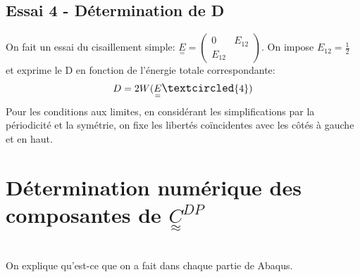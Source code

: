 \documentclass{article}
\begin{document}
\subsection{Essai \large{\textcircled{\small{4}}} - Détermination de D}
On fait un essai du cisaillement simple: $\underset{=}{E}=\begin{pmatrix}0 & E_{12}\\E_{12}\end{pmatrix}$. On impose $E_{12}=\frac{1}{2}$ et exprime le D en fonction de l'énergie totale correspondante:\\
\begin{align*}
    D=2W(\underset{=}{E}\large{\textcircled{\small{4}}})
\end{align*}
Pour les conditions aux limites, en considérant les simplifications par la périodicité et la symétrie, on fixe les libertés coïncidentes avec les côtés à gauche et en haut. 



\section{Détermination numérique des composantes de $\underset{\approx}{C}^{DP}$}\leavevmode\\
On explique qu'est-ce que on a fait dans chaque partie de Abaqus.
\end{document}
